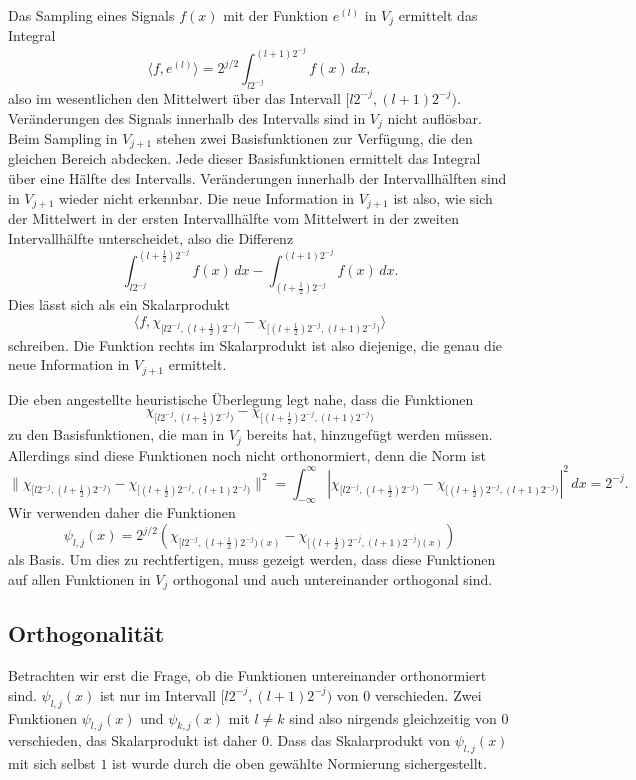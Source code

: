 Das Sampling eines Signals $f(x)$ mit der Funktion $e^{(l)}$ in $V_j$
ermittelt das Integral
\[
\langle f,e^{(l)}\rangle
=
2^{j/2}
\int_{l2^{-j}}^{(l+1)2^{-j}} f(x)\,dx,
\]
also im wesentlichen den Mittelwert über das Intervall $[l2^{-j},(l+1)2^{-j})$.
Veränderungen des Signals innerhalb des Intervalls sind in $V_j$ nicht
auflösbar.
Beim Sampling in $V_{j+1}$ stehen zwei Basisfunktionen zur Verfügung, die
den gleichen Bereich abdecken.
Jede dieser Basisfunktionen ermittelt das Integral über eine Hälfte des
Intervalls.
Veränderungen innerhalb der Intervallhälften sind in $V_{j+1}$ wieder nicht
erkennbar.
Die neue Information in $V_{j+1}$ ist also, wie sich der Mittelwert
in der ersten Intervallhälfte vom Mittelwert in der zweiten Intervallhälfte
unterscheidet, also die Differenz
\[
\int_{l2^{-j}}^{(l+\frac12)2^{-j}} f(x)\,dx
-
\int_{(l+\frac12)2^{-j}}^{(l+1)2^{-j}} f(x)\,dx.
\]
Dies lässt sich als ein Skalarprodukt
\[
\langle f,
\chi_{[l2^{-j},(l+\frac12)2^{-j})}
-
\chi_{[(l+\frac12)2^{-j},(l+1)2^{-j})}
\rangle
\]
schreiben.
Die Funktion rechts im Skalarprodukt ist also diejenige, die genau die
neue Information in $V_{j+1}$ ermittelt.

Die eben angestellte heuristische Überlegung legt nahe, dass die Funktionen
\begin{equation}
\chi_{[l2^{-j},(l+\frac12)2^{-j})}
-
\chi_{[(l+\frac12)2^{-j},(l+1)2^{-j})}
\end{equation}
zu den Basisfunktionen, die man in $V_j$ bereits hat, hinzugefügt werden
müssen.
Allerdings sind diese Funktionen noch nicht orthonormiert, denn die
Norm ist
\[
\|
\chi_{[l2^{-j},(l+\frac12)2^{-j})}
-
\chi_{[(l+\frac12)2^{-j},(l+1)2^{-j})}
\|^2
=
\int_{-\infty}^\infty
|
\chi_{[l2^{-j},(l+\frac12)2^{-j})}
-
\chi_{[(l+\frac12)2^{-j},(l+1)2^{-j})}
|^2
\,dx
=
2^{-j}.
\]
Wir verwenden daher die Funktionen
\[
\psi_{l,j}(x) = 2^{j/2}(
\chi_{[l2^{-j},(l+\frac12)2^{-j})(x)}
-
\chi_{[(l+\frac12)2^{-j},(l+1)2^{-j})(x)}
)
\]
als Basis.
Um dies zu rechtfertigen, muss gezeigt werden, dass diese Funktionen auf
allen Funktionen in $V_j$ orthogonal und auch untereinander orthogonal
sind.

\subsection{Orthogonalität}
Betrachten wir erst die Frage, ob die Funktionen untereinander orthonormiert
sind.
$\psi_{l,j}(x)$ ist nur im Intervall $[l2^{-j},(l+1)2^{-j})$ von $0$
verschieden.
Zwei Funktionen $\psi_{l,j}(x)$ und $\psi_{k,j}(x)$ mit $l\ne k$ sind
also nirgends gleichzeitig von $0$ verschieden, das Skalarprodukt ist
daher $0$.
Dass das Skalarprodukt von $\psi_{l,j}(x)$ mit sich selbst $1$ ist wurde
durch die oben gewählte Normierung sichergestellt.


